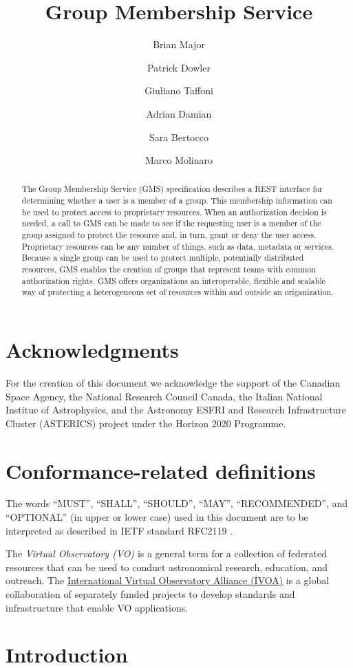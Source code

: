 \documentclass[11pt,a4paper]{ivoa}
\title{Group Membership Service}
\author{Brian Major}
\author{Patrick Dowler}
\author{Giuliano Taffoni}
\author{Adrian Damian}
\author{Sara Bertocco}
\author{Marco Molinaro}
\begin{document}
\begin{abstract}

The Group Membership Service (GMS) specification describes a REST interface for determining whether a user is a member of a group.  This membership information can be used to protect access to proprietary resources.  When an authorization decision is needed, a call to GMS can be made to see if the requesting user is a member of the group assigned to protect the resource and, in turn, grant or deny the user access.  Proprietary resources can be any number of things, such as data, metadata or services.  Because a single group can be used to protect multiple, potentially distributed resources, GMS enables the creation of groups that represent teams with common authorization rights.  GMS offers organizations an interoperable, flexible and scalable way of protecting a heterogeneous set of resources within and outside an origanization.

\end{abstract}

\section*{Acknowledgments}
For the creation of this document we acknowledge the support of the Canadian Space Agency, the National Research Council Canada, the Italian National Institue of Astrophysics, and the Astronomy ESFRI and Research Infrastructure Cluster (ASTERICS) project under the Horizon 2020 Programme.

\section*{Conformance-related definitions}

The words ``MUST'', ``SHALL'', ``SHOULD'', ``MAY'', ``RECOMMENDED'', and
``OPTIONAL'' (in upper or lower case) used in this document are to be
interpreted as described in IETF standard RFC2119 \citep{std:RFC2119}.

The \emph{Virtual Observatory (VO)} is a
general term for a collection of federated resources that can be used
to conduct astronomical research, education, and outreach.
The \href{http://www.ivoa.net}{International
Virtual Observatory Alliance (IVOA)} is a global
collaboration of separately funded projects to develop standards and
infrastructure that enable VO applications.


\section{Introduction}
\end{document}

